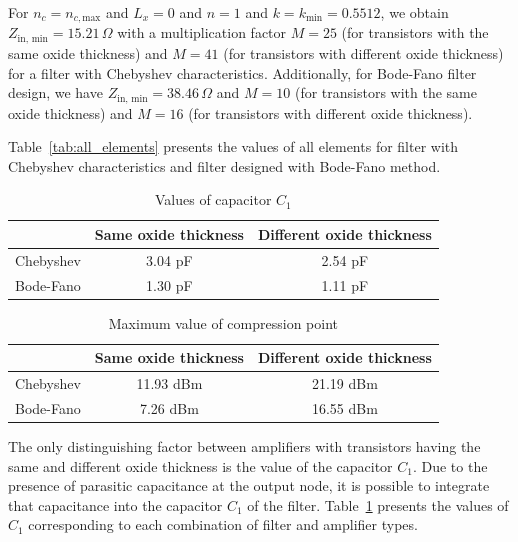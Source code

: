\documentclass[lettersize,journal]{IEEEtran}
\begin{document}
For $n_c = n_{c, \text{max}}$ and $L_x = 0$ and $n = 1$ and $k = k_{\text{min}} = 0.5512$, we obtain $Z_{\text{in, min}} = 15.21 \, \Omega$ with a multiplication factor $M = 25$ (for transistors with the same oxide thickness) and $M = 41$ (for transistors with different oxide thickness) for a filter with Chebyshev characteristics. Additionally, for Bode-Fano filter design, we have $Z_{\text{in, min}} = 38.46 \, \Omega$ and $M = 10$ (for transistors with the same oxide thickness) and $M = 16$ (for transistors with different oxide thickness).

Table~\ref{tab:all_elements} presents the values of all elements for filter with Chebyshev characteristics and filter designed with Bode-Fano method. 


\begin{table}[h!]
\caption{Values of capacitor $C_1$}
\footnotesize
\begin{center}
\begin{tabular}{ | c | c | c |}
    \hline
     & Same oxide thickness & Different oxide thickness \\ \hline
    Chebyshev & 3.04 pF & 2.54 pF \\ \hline
    Bode-Fano & 1.30 pF & 1.11 pF \\ \hline
  \end{tabular}
  \label{tab:c1}
\end{center}
\end{table}

\begin{table}[h!]
\caption{Maximum value of compression point}
\footnotesize
\begin{center}
\begin{tabular}{ | c | c | c |}
    \hline
     & Same oxide thickness & Different oxide thickness \\ \hline
    Chebyshev & 11.93 dBm & 21.19 dBm \\ \hline
    Bode-Fano &  7.26 dBm & 16.55 dBm \\ \hline
  \end{tabular}
  \label{tab:p1db}
\end{center}
\end{table}

\clearpage

The only distinguishing factor between amplifiers with transistors having the same and different oxide thickness is the value of the capacitor $C_1$. Due to the presence of parasitic capacitance at the output node, it is possible to integrate that capacitance into the capacitor $C_1$ of the filter. Table~\ref{tab:c1} presents the values of $C_1$ corresponding to each combination of filter and amplifier types.
\end{document}

